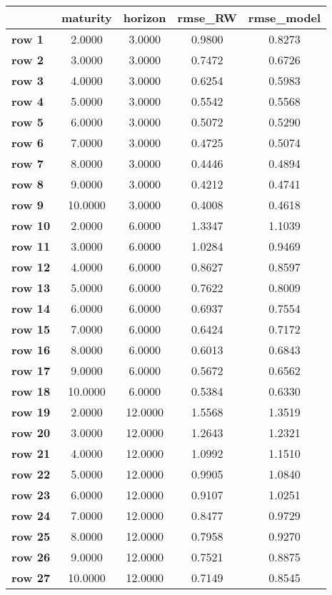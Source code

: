 \begin{tiny}\begin{tabular}{|l|c|c|c|c|}
\hline
&\textbf{maturity}&\textbf{horizon}&\textbf{rmse_RW}&\textbf{rmse_model}\\\hline
\textbf{row 1}&2.0000&3.0000&0.9800&0.8273\\\hline
\textbf{row 2}&3.0000&3.0000&0.7472&0.6726\\\hline
\textbf{row 3}&4.0000&3.0000&0.6254&0.5983\\\hline
\textbf{row 4}&5.0000&3.0000&0.5542&0.5568\\\hline
\textbf{row 5}&6.0000&3.0000&0.5072&0.5290\\\hline
\textbf{row 6}&7.0000&3.0000&0.4725&0.5074\\\hline
\textbf{row 7}&8.0000&3.0000&0.4446&0.4894\\\hline
\textbf{row 8}&9.0000&3.0000&0.4212&0.4741\\\hline
\textbf{row 9}&10.0000&3.0000&0.4008&0.4618\\\hline
\textbf{row 10}&2.0000&6.0000&1.3347&1.1039\\\hline
\textbf{row 11}&3.0000&6.0000&1.0284&0.9469\\\hline
\textbf{row 12}&4.0000&6.0000&0.8627&0.8597\\\hline
\textbf{row 13}&5.0000&6.0000&0.7622&0.8009\\\hline
\textbf{row 14}&6.0000&6.0000&0.6937&0.7554\\\hline
\textbf{row 15}&7.0000&6.0000&0.6424&0.7172\\\hline
\textbf{row 16}&8.0000&6.0000&0.6013&0.6843\\\hline
\textbf{row 17}&9.0000&6.0000&0.5672&0.6562\\\hline
\textbf{row 18}&10.0000&6.0000&0.5384&0.6330\\\hline
\textbf{row 19}&2.0000&12.0000&1.5568&1.3519\\\hline
\textbf{row 20}&3.0000&12.0000&1.2643&1.2321\\\hline
\textbf{row 21}&4.0000&12.0000&1.0992&1.1510\\\hline
\textbf{row 22}&5.0000&12.0000&0.9905&1.0840\\\hline
\textbf{row 23}&6.0000&12.0000&0.9107&1.0251\\\hline
\textbf{row 24}&7.0000&12.0000&0.8477&0.9729\\\hline
\textbf{row 25}&8.0000&12.0000&0.7958&0.9270\\\hline
\textbf{row 26}&9.0000&12.0000&0.7521&0.8875\\\hline
\textbf{row 27}&10.0000&12.0000&0.7149&0.8545\\\hline
\end{tabular}
\end{tiny}